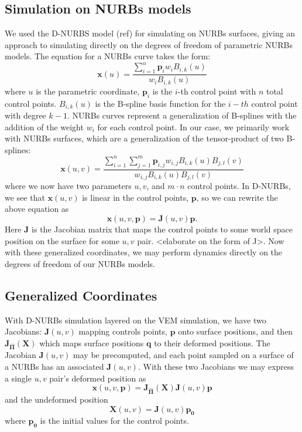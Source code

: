 \documentclass[sigconf]{acmart}
\begin{document}
\subsection{Simulation on NURBs models}
We used the D-NURBS model (ref) for simulating on NURBs surfaces, giving an approach to simulating directly on the degrees of freedom of parametric NURBs models. The equation for a NURBs curve takes the form:
\begin{equation}
    \mathbf{x}(u) = \frac{\sum_{i=1}^{n} \mathbf{p}_i w_i B_{i,k}(u)}{ w_i B_{i,k}(u)}
\end{equation}
where $u$ is the parametric coordinate, $\mathbf{p}_i$ is the $i$-th control point with $n$ total control points. $B_{i,k}(u)$ is the B-spline basis function for the $i-th$ control point with degree $k-1$. NURBs curves represent a generalization of B-splines with the addition of the weight $w_i$ for each control point. In our case, we primarily work with NURBs surfaces, which are a generalization of the tensor-product of two B-splines:
\begin{equation}
    \mathbf{x}(u,v) = \frac{\sum_{i=1}^{n}\sum_{j=1}^{m}  \mathbf{p}_{i,j} w_{i,j} B_{i,k}(u)B_{j,l}(v)}{ w_{i,j} B_{i,k}(u)B_{j,l}(v)}
\end{equation}
where we now have two parameters $u,v$, and $m\cdot n$ control points. In D-NURBs, we see that $\mathbf{x}(u,v)$ is linear in the control points, $\mathbf{p}$, so we can rewrite the above equation as
\begin{equation}
    \mathbf{x}(u,v,\mathbf{p}) = \mathbf{J}(u,v)\mathbf{p}.
\end{equation}
Here $\mathbf{J}$ is the Jacobian matrix that maps the control points to some world space position on the surface for some $u,v$ pair. <elaborate on the form of J>. Now with these generalized coordinates, we may perform dynamics directly on the degrees of freedom of our NURBs models. 

\subsection{Generalized Coordinates}
With D-NURBs simulation layered on the VEM simulation, we have two Jacobians: $\mathbf{J}(u,v)$ mapping controls points, $\mathbf{p}$ onto surface positions, and then $\mathbf{J_{\hat{\Pi}}(X)}$ which maps surface positions $\mathbf{q}$ to their deformed positions. The Jacobian $\mathbf{J}(u,v)$  may be precomputed, and each point sampled on a surface of a NURBs has an associated $\mathbf{J}(u,v)$. With these two Jacobians we may express a single $u,v$ pair's deformed position as
\begin{equation}
    \mathbf{x}(u,v,\mathbf{p}) = \mathbf{J_{\hat{\Pi}}(X)}\mathbf{J}(u,v)\mathbf{p}
\end{equation}
and the undeformed position
\begin{equation}
    \mathbf{X}(u,v) = \mathbf{J}(u,v)\mathbf{p_0}
\end{equation}
where $\mathbf{p_0}$ is the initial values for the control points.
\end{document}
